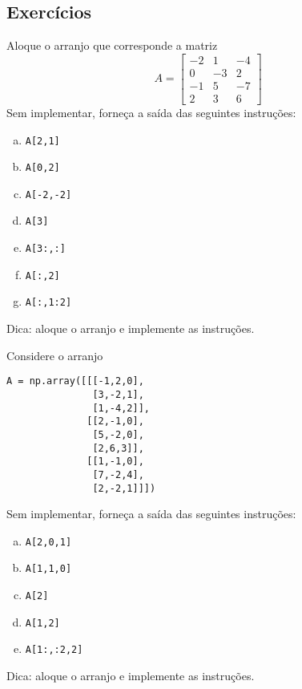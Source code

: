 \subsection{Exercícios}

\begin{exer}
  Aloque o arranjo que corresponde a matriz
  \begin{equation}
    A =
    \begin{bmatrix}
      -2 & 1 & -4\\
      0  & -3 & 2\\
      -1 & 5 & -7\\
      2 & 3 & 6
    \end{bmatrix}
  \end{equation}
  Sem implementar, forneça a saída das seguintes instruções:
  \begin{enumerate}[a)]
  \item \lstinline+A[2,1]+
  \item \lstinline+A[0,2]+
  \item \lstinline+A[-2,-2]+
  \item \lstinline+A[3]+
  \item \lstinline+A[3:,:]+
  \item \lstinline+A[:,2]+
  \item \lstinline+A[:,1:2]+
  \end{enumerate}
\end{exer}
\begin{resp}
  Dica: aloque o arranjo e implemente as instruções.
\end{resp}

\begin{exer}
  Considere o arranjo

\begin{lstlisting}
A = np.array([[[-1,2,0],
               [3,-2,1],
               [1,-4,2]],
              [[2,-1,0],
               [5,-2,0],
               [2,6,3]],
              [[1,-1,0],
               [7,-2,4],
               [2,-2,1]]])
\end{lstlisting}

Sem implementar, forneça a saída das seguintes instruções:
  \begin{enumerate}[a)]
  \item \lstinline+A[2,0,1]+
  \item \lstinline+A[1,1,0]+
  \item \lstinline+A[2]+
  \item \lstinline+A[1,2]+
  \item \lstinline+A[1:,:2,2]+
  \end{enumerate}
\end{exer}
\begin{resp}
  Dica: aloque o arranjo e implemente as instruções.
\end{resp}

